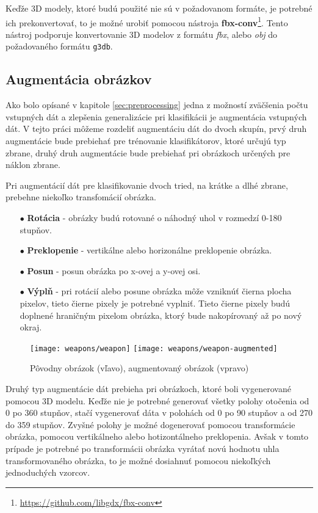 Keďže 3D modely, ktoré budú použité nie sú v požadovanom formáte, je potrebné ich prekonvertovať, to je možné urobiť
    pomocou nástroja \textbf{fbx-conv}\footnote{\url{https://github.com/libgdx/fbx-conv}}.
Tento nástroj podporuje konvertovanie 3D modelov z formátu \textit{fbx}, alebo \textit{obj} do požadovaného formátu \texttt{g3db}.

\subsection{Augmentácia obrázkov}
\label{subsec:augmentacia}
Ako bolo opísané v kapitole \ref{sec:preprocessing} jedna z možností zväčšenia počtu vstupných dát a zlepšenia generalizácie pri klasifikácii je augmentácia vstupných dát.
V tejto práci môžeme rozdeliť augmentáciu dát do dvoch skupín, prvý druh augmentácie bude prebiehať pre trénovanie klasifikátorov, ktoré
    určujú typ zbrane, druhý druh augmentácie bude prebiehať pri obrázkoch určených pre náklon zbrane.

Pri augmentácií dát pre klasifikovanie dvoch tried, na krátke a dlhé zbrane, prebehne niekoľko transfomácií obrázka.
\begin{enumerate}
    \item[$\bullet$] \textbf{Rotácia} - obrázky budú rotované o náhodný uhol v rozmedzí 0-180 stupňov.
    \item[$\bullet$] \textbf{Preklopenie} - vertikálne alebo horizonálne preklopenie obrázka.
    \item[$\bullet$] \textbf{Posun} - posun obrázka po x-ovej a y-ovej osi.
    \item[$\bullet$] \textbf{Výplň} - pri rotácií alebo posune obrázka môže vzniknúť čierna plocha pixelov, tieto čierne pixely je potrebné vyplniť.
    Tieto čierne pixely budú doplnené hraničným pixelom obrázka, ktorý bude nakopírovaný až po nový okraj.
\end{enumerate}

\begin{figure}[H]
    \centering
    \texttt{[image: weapons/weapon]}
    \qquad
    \texttt{[image: weapons/weapon-augmented]}
    \caption{Pôvodny obrázok (vľavo), augmentovaný obrázok (vpravo)}
    \label{pic:imageAugmented}
\end{figure}

Druhý typ augmentácie dát prebieha pri obrázkoch, ktoré boli vygenerované pomocou 3D modelu.
Keďže nie je potrebné generovať všetky polohy otočenia od 0 po 360 stupňov, stačí vygenerovať dáta v polohách od 0 po 90 stupňov a od 270 do 359 stupňov.
Zvyšné polohy je možné dogenerovať pomocou transformácie obrázka, pomocou vertikálneho alebo hotizontálneho preklopenia.
Avšak v tomto prípade je potrebné po transformácii obrázka vyrátať novú hodnotu uhla transformovaného obrázka, to je možné dosiahnuť pomocou niekoľkých
    jednoduchých vzorcov.

